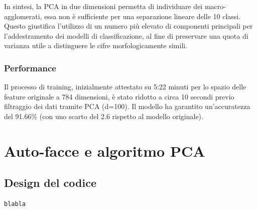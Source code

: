 \documentclass[a4paper,11pt]{article}
\begin{document}
\noindent In sintesi, la PCA in due dimensioni permetta di individuare dei macro-agglomerati, essa non è sufficiente per una separazione lineare delle 10 classi. Questo giustifica l'utilizzo di un numero più elevato di componenti principali per l'addestramento dei modelli di classificazione, al fine di preservare una quota di varianza utile a distinguere le cifre morfologicamente simili.

\subsubsection*{Performance}
Il processo di training, inizialmente attestato su 5:22 minuti per lo spazio delle feature originale a 784 dimensioni, è stato ridotto a circa 10 secondi previo filtraggio dei dati tramite PCA (d=100). Il modello ha garantito un'accuratezza del 91.66\% (con uno scarto del 2.6 \textperthousand rispetto al modello originale).



\iffalse
\section{Auto-facce e algoritmo PCA}
\subsection{Design del codice}
\begin{lstlisting}[language=Python]
blabla
\end{lstlisting}
\end{document}

